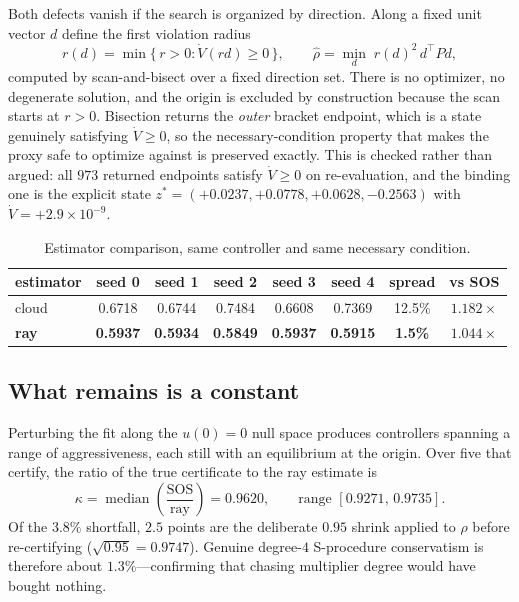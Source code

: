 \documentclass[11pt]{article}
\theoremstyle{plain}
\theoremstyle{definition}
\newcommand{\Vdot}{\dot{V}}
\begin{document}
Both defects vanish if the search is organized by direction. Along a fixed unit
vector $d$ define the first violation radius
\begin{equation}
r(d)=\min\{\,r>0:\Vdot(rd)\ge0\,\},\qquad
\hat\rho=\min_{d}\;r(d)^{2}\,d^{\top}Pd,
\label{eq:ray}
\end{equation}
computed by scan-and-bisect over a fixed direction set. There is no optimizer,
no degenerate solution, and the origin is excluded by construction because the
scan starts at $r>0$. Bisection returns the \emph{outer} bracket endpoint, which
is a state genuinely satisfying $\Vdot\ge0$, so the necessary-condition property
that makes the proxy safe to optimize against is preserved exactly. This is
checked rather than argued: all $973$ returned endpoints satisfy $\Vdot\ge0$ on
re-evaluation, and the binding one is the explicit state
$z^{*}=(+0.0237,+0.0778,+0.0628,-0.2563)$ with $\Vdot=+2.9\times10^{-9}$.

\begin{table}[t]
\centering
\caption{Estimator comparison, same controller and same necessary condition.}
\label{tab:estimator}
\begin{tabular}{lccccccc}
\toprule
estimator & seed 0 & seed 1 & seed 2 & seed 3 & seed 4 & spread & vs SOS \\
\midrule
cloud & 0.6718 & 0.6744 & 0.7484 & 0.6608 & 0.7369 & 12.5\% & $1.182\times$ \\
\textbf{ray} & \textbf{0.5937} & \textbf{0.5934} & \textbf{0.5849} &
\textbf{0.5937} & \textbf{0.5915} & \textbf{1.5\%} & $\mathbf{1.044\times}$ \\
\bottomrule
\end{tabular}
\end{table}

\subsection{What remains is a constant}

Perturbing the fit along the $u(0)=0$ null space produces controllers spanning a
range of aggressiveness, each still with an equilibrium at the origin. Over
five that certify, the ratio of the true certificate to the ray estimate is
\begin{equation}
\kappa=\operatorname{median}\!\left(\frac{\text{SOS}}{\text{ray}}\right)=0.9620,
\qquad\text{range }[0.9271,\,0.9735].
\end{equation}
Of the $3.8\%$ shortfall, $2.5$ points are the deliberate $0.95$ shrink applied
to $\rho$ before re-certifying ($\sqrt{0.95}=0.9747$). Genuine degree-$4$
S-procedure conservatism is therefore about $1.3\%$---confirming that chasing
multiplier degree would have bought nothing.
\end{document}
